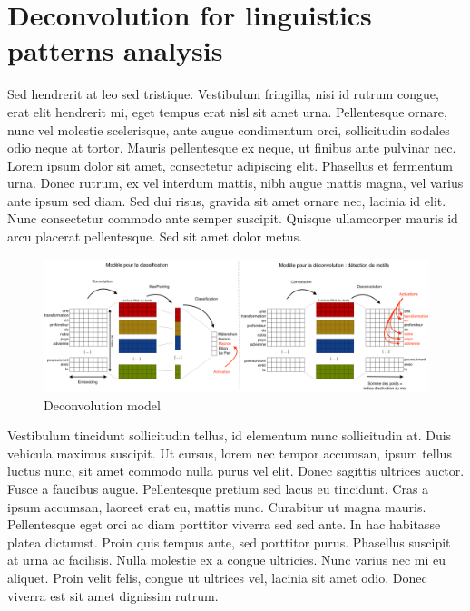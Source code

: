 \section{Deconvolution for linguistics patterns analysis}

Sed hendrerit at leo sed tristique. Vestibulum fringilla, nisi id rutrum congue, erat elit hendrerit mi, eget tempus erat nisl sit amet urna. Pellentesque ornare, nunc vel molestie scelerisque, ante augue condimentum orci, sollicitudin sodales odio neque at tortor. Mauris pellentesque ex neque, ut finibus ante pulvinar nec. Lorem ipsum dolor sit amet, consectetur adipiscing elit. Phasellus et fermentum urna. Donec rutrum, ex vel interdum mattis, nibh augue mattis magna, vel varius ante ipsum sed diam. Sed dui risus, gravida sit amet ornare nec, lacinia id elit. Nunc consectetur commodo ante semper suscipit. Quisque ullamcorper mauris id arcu placerat pellentesque. Sed sit amet dolor metus.

\begin{figure}[h]
\begin{center}
\includegraphics[width=16cm]{img/model.png}
\caption{Deconvolution model}
\label{cnn}
\end{center}
\end{figure}

Vestibulum tincidunt sollicitudin tellus, id elementum nunc sollicitudin at. Duis vehicula maximus suscipit. Ut cursus, lorem nec tempor accumsan, ipsum tellus luctus nunc, sit amet commodo nulla purus vel elit. Donec sagittis ultrices auctor. Fusce a faucibus augue. Pellentesque pretium sed lacus eu tincidunt. Cras a ipsum accumsan, laoreet erat eu, mattis nunc. Curabitur ut magna mauris. Pellentesque eget orci ac diam porttitor viverra sed sed ante. In hac habitasse platea dictumst. Proin quis tempus ante, sed porttitor purus. Phasellus suscipit at urna ac facilisis. Nulla molestie ex a congue ultricies. Nunc varius nec mi eu aliquet. Proin velit felis, congue ut ultrices vel, lacinia sit amet odio. Donec viverra est sit amet dignissim rutrum.

